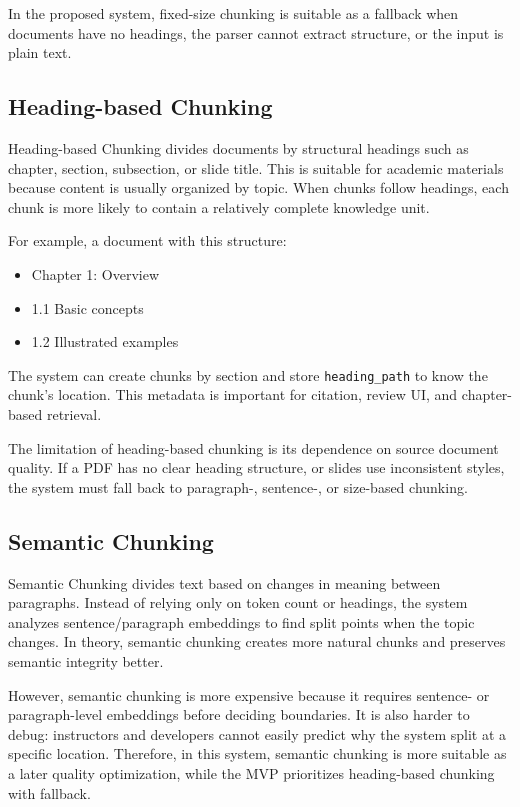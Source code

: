 In the proposed system, fixed-size chunking is suitable as a fallback when
documents have no headings, the parser cannot extract structure, or the
input is plain text.

\subsection{Heading-based Chunking}
\label{subsec:heading-based-chunking}

Heading-based Chunking divides documents by structural headings such as
chapter, section, subsection, or slide title. This is suitable for
academic materials because content is usually organized by topic. When
chunks follow headings, each chunk is more likely to contain a relatively
complete knowledge unit.

For example, a document with this structure:

\begin{itemize}
    \item Chapter 1: Overview
    \item 1.1 Basic concepts
    \item 1.2 Illustrated examples
\end{itemize}

The system can create chunks by section and store \texttt{heading\_path}
to know the chunk's location. This metadata is important for citation,
review UI, and chapter-based retrieval.

The limitation of heading-based chunking is its dependence on source
document quality. If a PDF has no clear heading structure, or slides use
inconsistent styles, the system must fall back to paragraph-, sentence-,
or size-based chunking.

\subsection{Semantic Chunking}
\label{subsec:semantic-chunking}

Semantic Chunking divides text based on changes in meaning between
paragraphs. Instead of relying only on token count or headings, the
system analyzes sentence/paragraph embeddings to find split points when
the topic changes. In theory, semantic chunking creates more natural
chunks and preserves semantic integrity better.

However, semantic chunking is more expensive because it requires
sentence- or paragraph-level embeddings before deciding boundaries. It is
also harder to debug: instructors and developers cannot easily predict
why the system split at a specific location. Therefore, in this system,
semantic chunking is more suitable as a later quality optimization, while
the MVP prioritizes heading-based chunking with fallback.

